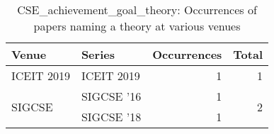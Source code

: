 \begin{table*}[t]
\begin{tabular}{llrr}
Venue & Series & Occurrences & Total\\\hline
\multirow{1}{*}{ICEIT 2019} & ICEIT 2019 & 1 & \multirow{1}{*}{1}\\
\multirow{2}{*}{SIGCSE } & SIGCSE '16 & 1 & \multirow{2}{*}{2}\\
& SIGCSE '18 & 1 &\\
\end{tabular}
\caption{CSE\_achievement\_goal\_theory: Occurrences of papers naming a theory at various venues}
\end{table*}